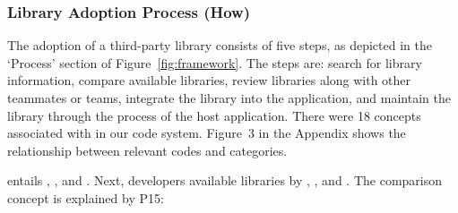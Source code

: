 

\subsubsection{Library Adoption Process (How)}\label{sec:phases} 


The adoption of a third-party library consists of five steps, as depicted in the `Process' section of Figure~\ref{fig:framework}. The steps are: search for library information, compare available libraries, review libraries along with other teammates or teams, integrate the library into the application, and maintain the library through the process of the host application. There were 18 concepts associated with  in our code system. Figure~3 in the Appendix shows the relationship between relevant codes and categories.

 entails , , and . Next, developers  available libraries by , , and . The comparison concept is explained by P15:


